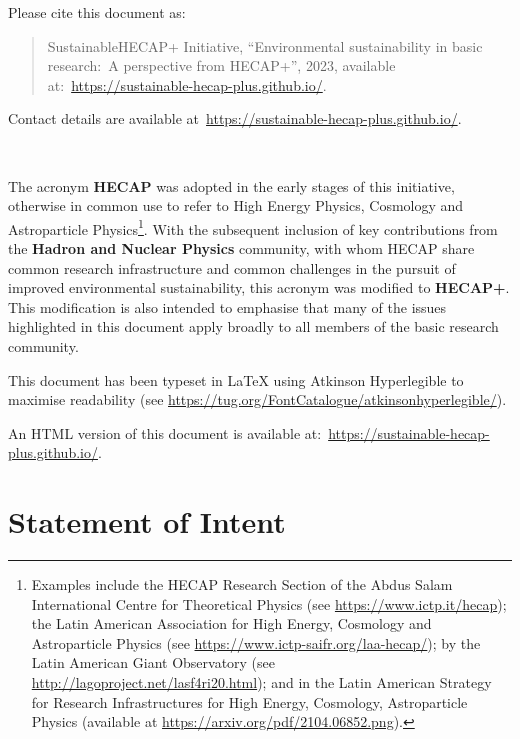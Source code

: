 \documentclass[../SustainableHEP.tex]{subfiles}
\begin{document}
\noindent Please cite this document as:
\begin{quotation}
    SustainableHECAP+ Initiative, ``Environmental sustainability in basic research:\ A perspective from HECAP+'', 2023, available at:~\url{https://sustainable-hecap-plus.github.io/}.
\end{quotation}

\noindent Contact details are available at~\url{https://sustainable-hecap-plus.github.io/}.

\newpage

\thispagestyle{empty}

~

\vspace{10em}
\RaggedRight

\noindent The acronym {\bf HECAP} was adopted in the early stages of this initiative, otherwise in common use to refer to High Energy Physics, Cosmology and Astroparticle Physics\footnote{Examples include the HECAP Research Section of the Abdus Salam International Centre for Theoretical Physics (see \url{https://www.ictp.it/hecap}); the Latin American Association for High Energy, Cosmology and Astroparticle Physics (see \url{https://www.ictp-saifr.org/laa-hecap/}); by the Latin American Giant Observatory (see \url{http://lagoproject.net/lasf4ri20.html}); and in the Latin American Strategy for Research Infrastructures for High Energy, Cosmology, Astroparticle Physics (available at \url{https://arxiv.org/pdf/2104.06852.png}).}. With the subsequent inclusion of key contributions from the \textbf{Hadron and Nuclear Physics} community, with whom HECAP share common research infrastructure and common challenges in the pursuit of improved environmental sustainability, this acronym was modified to {\bf HECAP+}. This modification is also intended to emphasise that many of the issues highlighted in this document apply broadly to all members of the basic research community.

\vspace{10em}

\noindent This document has been typeset in LaTeX using Atkinson Hyperlegible to maximise readability (see \url{https://tug.org/FontCatalogue/atkinsonhyperlegible/}).

\noindent An HTML version of this document is available at:~\url{https://sustainable-hecap-plus.github.io/}.

\newpage

\thispagestyle{empty}

\section*{Statement of Intent}
    
\end{document}
